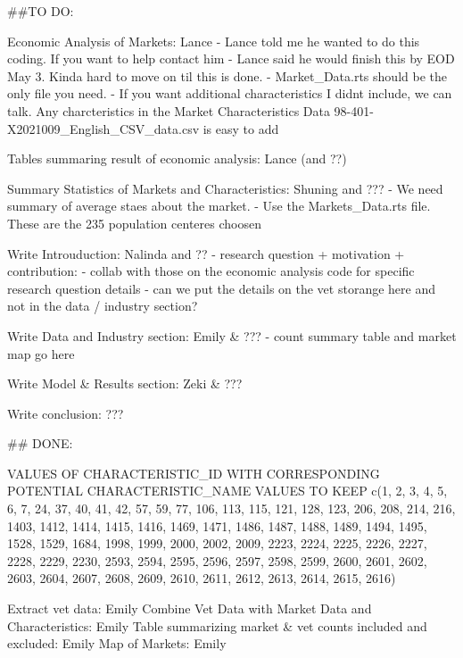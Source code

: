 ##TO DO:

Economic Analysis of Markets: Lance  
    - Lance told me he wanted to do this coding. If you want to help contact him  
    - Lance said he would finish this by EOD May 3. Kinda hard to move on til this is done.   
    - Market_Data.rts should be the only file you need. 
    - If you want additional characteristics I didnt include, we can talk. Any charcteristics in the Market Characteristics Data 98-401-X2021009_English_CSV_data.csv is easy to add

Tables summaring result of economic analysis: Lance (and ??)

Summary Statistics of Markets and Characteristics: Shuning and ???
    - We need summary of average staes about the market. 
    - Use the Markets_Data.rts file. These are the 235 population centeres choosen

Write Introuduction: Nalinda and ??
    - research question + motivation + contribution: 
    - collab with those on the economic analysis code for specific research question details 
    - can we put the details on the vet storange here and not in the data / industry section? 

Write Data and Industry section: Emily & ???
    - count summary table and market map go here 

Write Model & Results section: Zeki & ???

Write conclusion:  ???

## DONE: 

VALUES OF CHARACTERISTIC_ID WITH CORRESPONDING POTENTIAL CHARACTERISTIC_NAME VALUES TO KEEP 
c(1, 2, 3, 4, 5, 6, 7, 24, 37, 40, 41, 42, 57, 59, 77, 106, 113, 115, 121, 128, 123, 206, 208, 214, 216, 1403, 1412, 1414, 1415, 1416, 1469, 1471, 1486, 1487, 1488, 1489, 1494, 1495, 1528, 1529, 1684, 1998, 1999, 2000, 2002, 2009, 2223, 2224, 2225, 2226, 2227, 2228, 2229, 2230, 2593, 2594, 2595, 2596, 2597, 2598, 2599, 2600, 2601, 2602, 2603, 2604, 2607, 2608, 2609, 2610, 2611, 2612, 2613, 2614, 2615, 2616)

Extract vet data: Emily 
Combine Vet Data with Market Data and Characteristics: Emily 
Table summarizing market & vet counts included and excluded: Emily
Map of Markets: Emily 
